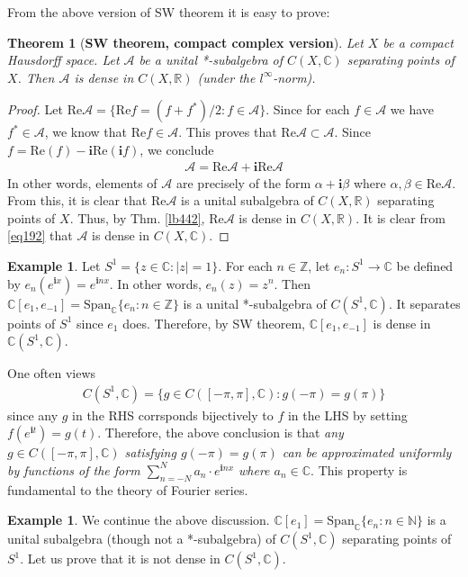 \documentclass[12pt,b5paper,notitlepage]{article}
\theoremstyle{definition}
\newtheorem{eg}[df]{Example}
\theoremstyle{plain}
\newtheorem{thm}[df]{Theorem}
\newcommand{\Span}{\mathrm{Span}}
\newcommand{\scr}{\mathscr}
\newcommand{\im}{\mathbf{i}}
\newcommand{\Cbb}{\mathbb C}
\newcommand{\Nbb}{\mathbb N}
\newcommand{\Zbb}{\mathbb Z}
\newcommand{\Rbb}{\mathbb R}
\newcommand{\Real}{\mathrm{Re}}
\numberwithin{equation}{section}
\begin{document}
From the above version of SW theorem it is easy to prove:

\begin{thm}[\textbf{SW theorem, compact complex version}]\label{lb450}
Let $X$ be a compact Hausdorff space. Let $\scr A$ be a unital *-subalgebra of $C(X,\Cbb)$ separating points of $X$. Then $\scr A$ is dense in $C(X,\Rbb)$ (under the $l^\infty$-norm).
\end{thm}

\begin{proof}
Let $\Real\scr A=\{\Real f=(f+f^*)/2:f\in\scr A\}$. Since for each $f\in\scr A$ we have $f^*\in\scr A$, we know that $\Real f\in\scr A$. This proves that $\Real\scr A\subset\scr A$. Since $f=\Real( f)-\im\Real(\im f)$, we conclude
\begin{align}
\scr A=\Real\scr A+\im\Real\scr A  \label{eq192}
\end{align}
In other words, elements of $\scr A$ are precisely of the form $\alpha+\im\beta$ where $\alpha,\beta\in\Real\scr A$. From this, it is clear that $\Real\scr A$ is a unital subalgebra of $C(X,\Rbb)$ separating points of $X$. Thus, by Thm. \ref{lb442}, $\Real\scr A$ is dense in $C(X,\Rbb)$. It is clear from \eqref{eq192} that $\scr A$ is dense in $C(X,\Cbb)$.
\end{proof}


\begin{eg}\label{lb443}
Let $S^1=\{z\in\Cbb:|z|=1\}$. For each $n\in\Zbb$, let $e_n:S^1\rightarrow \Cbb$ be defined by $e_n(e^{\im x})=e^{\im nx}$. In other words, $e_n(z)=z^n$. Then $\Cbb[e_1,e_{-1}]=\Span_\Cbb\{e_n:n\in\Zbb\}$ is a unital *-subalgebra of $C(S^1,\Cbb)$. It separates points of $S^1$ since $e_1$ does. Therefore, by SW theorem, $\Cbb[e_1,e_{-1}]$ is dense in $\Cbb(S^1,\Cbb)$. 

One often views
\begin{align}
C(S^1,\Cbb)=\{g\in C([-\pi,\pi],\Cbb):g(-\pi)=g(\pi)\}
\end{align}
since any $g$ in the RHS corrsponds bijectively to $f$ in the LHS by setting $f(e^{\im t})=g(t)$. Therefore, the above conclusion is that \textit{any $g\in C([-\pi,\pi],\Cbb)$ satisfying $g(-\pi)=g(\pi)$ can be approximated uniformly by functions of the form $\sum_{n=-N}^N a_n\cdot e^{\im nx}$ where $a_n\in\Cbb$}. This property is fundamental  to the theory of Fourier series. \hfill\qedsymbol
\end{eg}


\begin{eg}
We continue the above discussion. $\Cbb[e_1]=\Span_\Cbb\{e_n:n\in\Nbb\}$ is a unital subalgebra (though not a *-subalgebra) of $C(S^1,\Cbb)$ separating points of $S^1$. Let us prove that it is not dense in $C(S^1,\Cbb)$. 
\end{eg}
\end{document}
